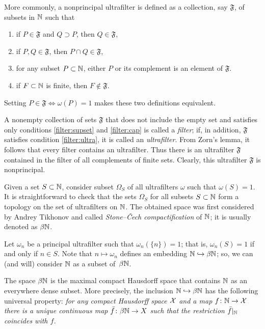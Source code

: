 More commonly, a nonprincipal ultrafilter is defined as a collection, say $\mathfrak{F}$, of subsets in $\mathbb{N}$ such that
\begin{enumerate}
\item\label{filter:supset} if $P\in \mathfrak{F}$ and $Q\supset P$, then $Q\in \mathfrak{F}$,
\item\label{filter:cap} if $P, Q\in \mathfrak{F}$, then $P\cap Q\in \mathfrak{F}$,
\item\label{filter:ultra} for any subset $P\subset\mathbb{N}$, either $P$ or its complement is an element of $\mathfrak{F}$.
\item\label{filter:non-prin} if $F\subset \mathbb{N} $ is finite, then $F\notin \mathfrak{F}$.
\end{enumerate}
Setting $P\in\mathfrak{F}\Leftrightarrow\omega(P)=1$ makes these two definitions equivalent.

A nonempty collection of sets $\mathfrak{F}$ that does not include the empty set and satisfies only conditions \ref{filter:supset} and \ref{filter:cap} is called a \emph{filter}; 
if, in addition, $\mathfrak{F}$ satisfies condition \ref{filter:ultra}, it is called an \emph{ultrafilter}.
From Zorn's lemma, it follows that every filter contains an ultrafilter.
Thus there is an ultrafilter $\mathfrak{F}$ contained in the filter of all complements of finite sets.
Clearly, this ultrafilter $\mathfrak{F}$ is nonprincipal.


Given a set $S\subset \mathbb{N}$, consider subset $\Omega_S$ of all ultrafilters $\omega$ such that $\omega(S)=1$.
It is straightforward to check that the sets $\Omega_S$ for all subsets $S\subset \mathbb{N}$ form a topology on the set of ultrafilters on $\mathbb{N}$. 
The obtained space was first considered by Andrey Tikhonov and called \emph{Stone--\v{C}ech compactification} of $\mathbb{N}$;
it is usually denoted as $\beta\mathbb{N}$.

Let $\omega_n$ be a principal ultrafilter such that $\omega_n(\{n\})=1$; that is, $\omega_n(S)=1$ if and only if $n\in S$.
Note that $n\mapsto\omega_n$ defines an embedding $\mathbb{N}\hookrightarrow\beta\mathbb{N}$;
so, we can (and will) consider $\mathbb{N}$ as a subset of~$\beta\mathbb{N}$.

The space $\beta\mathbb{N}$ is the maximal compact Hausdorff space that contains $\mathbb{N}$  as an everywhere dense subset.
More precisely, the inclusion $\mathbb{N}\hookrightarrow\beta\mathbb{N}$ has the following universal property:
\textit{for any compact Hausdorff space $\mathcal{X}$ 
and a map $f\colon\mathbb{N}\to \mathcal{X}$ there is a unique continuous map $\bar f\colon\beta\mathbb{N}\to X$ such that the restriction $\bar f|_{\mathbb{N}}$ coincides with $f$.} 

